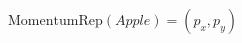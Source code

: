\documentclass[preview]{standalone}
\begin{document}
\begin{align*}
\text{MomentumRep}(Apple)=(p_x, p_y)
\end{align*}
\end{document}
